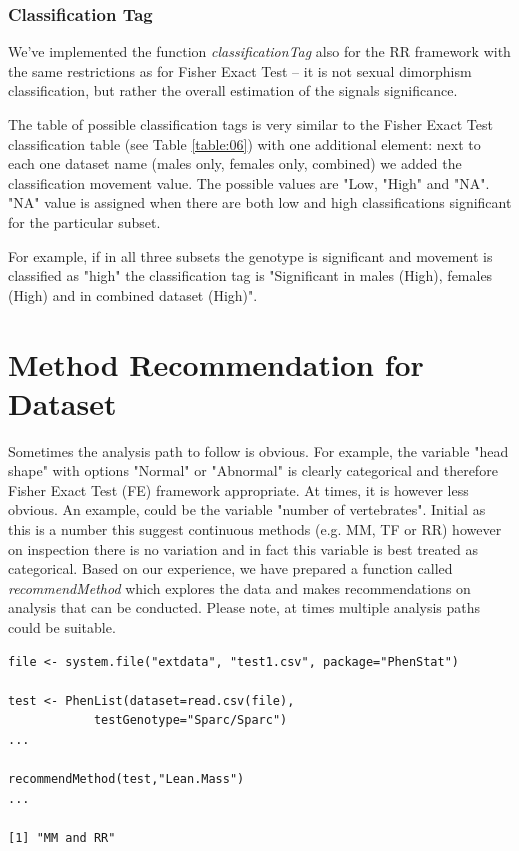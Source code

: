 \documentclass[12pt,a4paper]{article}
\begin{document}
\subsubsection{Classification Tag}
We've implemented the function \textit{classificationTag} also for the RR framework with the same restrictions as for Fisher Exact Test -- it is not sexual dimorphism classification, but rather the overall estimation of the signals significance.

The table of possible classification tags is very similar to the Fisher Exact Test classification table (see Table \ref{table:06}) with one additional element: next to each one dataset name (males only, females only, combined) we added the classification movement value. The possible values are "Low, "High" and "NA". "NA" value is assigned when there are both low and high classifications significant for the particular subset.

For example, if in all three subsets the genotype is significant and movement is classified as "high" the classification tag is "Significant in males (High), females (High) and in combined dataset (High)".

\section{Method Recommendation for Dataset}
\label{section:Recommendation}

Sometimes the analysis path to follow is obvious. For example, the variable "head shape" with options "Normal" or "Abnormal" is clearly categorical and therefore Fisher Exact Test (FE) framework appropriate. At times, it is however less obvious. An example, could be the variable "number of vertebrates". Initial as this is a number this suggest continuous methods (e.g. MM, TF or RR)  however on inspection there is no variation and in fact this variable is best treated as categorical. Based on our experience, we have prepared a function called \textit{recommendMethod} which explores the data and makes recommendations on analysis that can be conducted. Please note, at times multiple analysis paths could be suitable. 


\begingroup
\fontsize{8pt}{12pt}\selectfont
\begin{verbatim}
file <- system.file("extdata", "test1.csv", package="PhenStat")

test <- PhenList(dataset=read.csv(file),
            testGenotype="Sparc/Sparc")
...

recommendMethod(test,"Lean.Mass")
...

[1] "MM and RR"
\end{verbatim}
\endgroup
\end{document}
